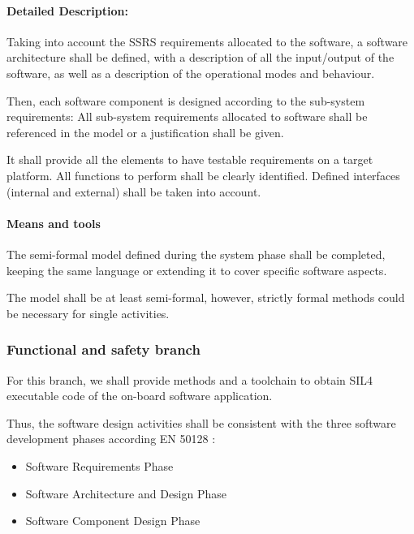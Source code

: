 \paragraph{Detailed Description:}
\label{sec:sw-req-deta-descr}

Taking into account the SSRS requirements allocated to  the software, a software architecture shall be defined, with a description of all the input/output of the software, as well as a description of the operational modes and behaviour.

Then, each software component is designed according to  the sub-system  requirements: All sub-system requirements allocated to  software shall be referenced in the model or a justification shall be given.

It shall provide all the elements to have testable requirements on a target platform. All functions to perform shall be clearly identified. Defined interfaces (internal and external) shall be  taken into account.


\paragraph{Means and tools}
\label{sec:sw-means}

The semi-formal model defined during the system phase shall be completed, keeping the same language or extending it to  cover specific software aspects.

The model  shall be at least semi-formal, however, strictly  formal  methods could be necessary for single activities.

\subsubsection{Functional and safety branch}

For this branch, we shall provide methods and a toolchain to  obtain SIL4 executable code of the on-board software application. 

Thus, the software design activities shall be consistent with the three software development phases according EN 50128 :

\begin{itemize}
\item Software Requirements Phase
\item Software Architecture and Design Phase
\item Software Component Design Phase
\end{itemize}

